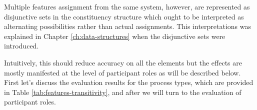     Multiple features assignment from the same system, however, are represented as disjunctive sets in the constituency structure which ought to be interpreted as alternating possibilities rather than actual assignments. This interpretations was explained in Chapter \ref{ch:data-structures} when the disjunctive sets were introduced.
    
    Intuitively, this should reduce accuracy on all the elements but the effects are mostly manifested at the level of participant roles as will be described below. First let's discuss the evaluation results for the process types, which are provided in Table \ref{tab:features-transitivity}, and after we will turn to the evaluation of participant roles.
    
    \begin{table}[!ht]
    \centering
    \caption{The evaluation statistics available for the PROCESS-TYPE system and few of its subsystems from the TRANSITIVITY system network}
    \label{tab:features-transitivity}
    \end{table}
    
